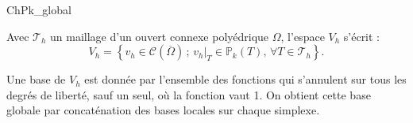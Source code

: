 \medskip

\begin{corrige}{ChPk_global}

Avec $\mathcal{T}_h$ un maillage d'un ouvert connexe polyédrique $\Omega$, l'espace $V_h$ s'écrit :
\[
V_h = \left \{ v_h \in \mathcal{C}(\overline{\Omega}) \, ; \, v_h|_T \in \mathbb{P}_k(T), \, \forall T \in \mathcal{T}_h \right \}.
\]

Une base de $V_h$ est donnée par l'ensemble des fonctions qui s'annulent sur tous les degrés de liberté, sauf un seul, où la fonction vaut 1. On obtient cette base globale par concaténation des bases locales sur chaque simplexe. 

\end{corrige}




